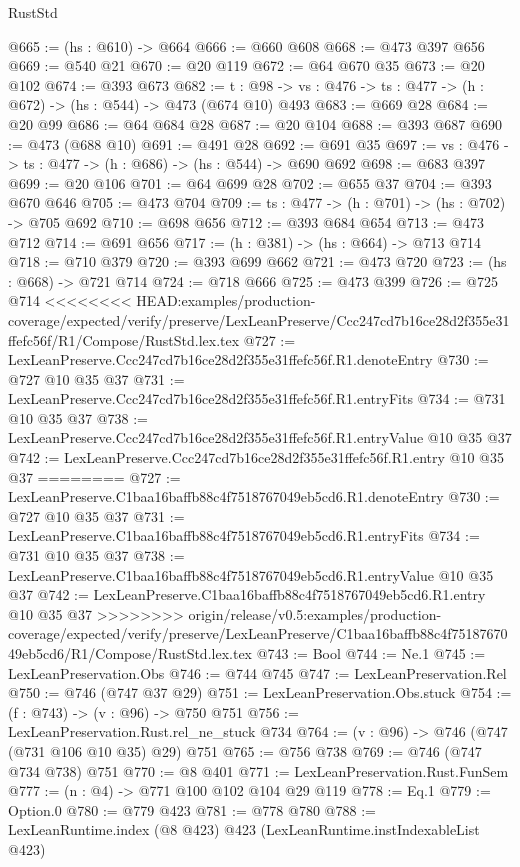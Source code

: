 \begin{lexlean}{RustStd}
\begin{coremodule}
{\begin{coremodule}
@665 := (hs : @610) -> @664
@666 := @660 @608
@668 := @473 @397 @656
@669 := @540 @21
@670 := @20 @119
@672 := @64 @670 @35
@673 := @20 @102
@674 := @393 @673
@682 := {t : @98} -> {vs : @476} -> {ts : @477} -> (h : @672) -> (hs : @544) -> @473 (@674 @10) @493
@683 := @669 @28
@684 := @20 @99
@686 := @64 @684 @28
@687 := @20 @104
@688 := @393 @687
@690 := @473 (@688 @10)
@691 := @491 @28
@692 := @691 @35
@697 := {vs : @476} -> {ts : @477} -> (h : @686) -> (hs : @544) -> @690 @692
@698 := @683 @397
@699 := @20 @106
@701 := @64 @699 @28
@702 := @655 @37
@704 := @393 @670 @646
@705 := @473 @704
@709 := {ts : @477} -> (h : @701) -> (hs : @702) -> @705 @692
@710 := @698 @656
@712 := @393 @684 @654
@713 := @473 @712
@714 := @691 @656
@717 := (h : @381) -> (hs : @664) -> @713 @714
@718 := @710 @379
@720 := @393 @699 @662
@721 := @473 @720
@723 := (hs : @668) -> @721 @714
@724 := @718 @666
@725 := @473 @399
@726 := @725 @714
<<<<<<<< HEAD:examples/production-coverage/expected/verify/preserve/LexLeanPreserve/Ccc247cd7b16ce28d2f355e31ffefc56f/R1/Compose/RustStd.lex.tex
@727 := LexLeanPreserve.Ccc247cd7b16ce28d2f355e31ffefc56f.R1.denoteEntry
@730 := @727 @10 @35 @37
@731 := LexLeanPreserve.Ccc247cd7b16ce28d2f355e31ffefc56f.R1.entryFits
@734 := @731 @10 @35 @37
@738 := LexLeanPreserve.Ccc247cd7b16ce28d2f355e31ffefc56f.R1.entryValue @10 @35 @37
@742 := LexLeanPreserve.Ccc247cd7b16ce28d2f355e31ffefc56f.R1.entry @10 @35 @37
========
@727 := LexLeanPreserve.C1baa16baffb88c4f7518767049eb5cd6.R1.denoteEntry
@730 := @727 @10 @35 @37
@731 := LexLeanPreserve.C1baa16baffb88c4f7518767049eb5cd6.R1.entryFits
@734 := @731 @10 @35 @37
@738 := LexLeanPreserve.C1baa16baffb88c4f7518767049eb5cd6.R1.entryValue @10 @35 @37
@742 := LexLeanPreserve.C1baa16baffb88c4f7518767049eb5cd6.R1.entry @10 @35 @37
>>>>>>>> origin/release/v0.5:examples/production-coverage/expected/verify/preserve/LexLeanPreserve/C1baa16baffb88c4f7518767049eb5cd6/R1/Compose/RustStd.lex.tex
@743 := Bool
@744 := Ne.{1}
@745 := LexLeanPreservation.Obs
@746 := @744 @745
@747 := LexLeanPreservation.Rel
@750 := @746 (@747 @37 @29)
@751 := LexLeanPreservation.Obs.stuck
@754 := (f : @743) -> (v : @96) -> @750 @751
@756 := LexLeanPreservation.Rust.rel_ne_stuck @734
@764 := (v : @96) -> @746 (@747 (@731 @106 @10 @35) @29) @751
@765 := @756 @738
@769 := @746 (@747 @734 @738) @751
@770 := @8 @401
@771 := LexLeanPreservation.Rust.FunSem
@777 := (n : @4) -> @771 @100 @102 @104 @29 @119
@778 := Eq.{1}
@779 := Option.{0}
@780 := @779 @423
@781 := @778 @780
@788 := LexLeanRuntime.index (@8 @423) @423 (LexLeanRuntime.instIndexableList @423)

\end{coremodule}}
\end{coremodule}
\end{lexlean}
